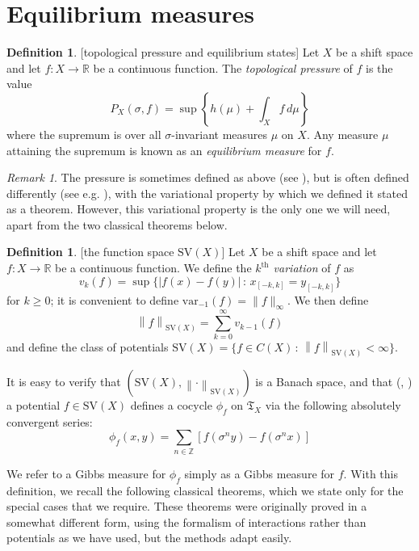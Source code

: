 \documentclass{amsproc}
\numberwithin{theorem}{section}
\theoremstyle{remark}
\newtheorem*{remark}{Remark}
\theoremstyle{definition}
\newtheorem{defn}[theorem]{Definition}
\newcommand{\fT}{\mathfrak{T}}
\newcommand{\Z}{\mathbb{Z}}
\newcommand{\R}{\mathbb{R}}
\newcommand{\SV}{\mathrm{SV}}
\newcommand\SVnorm[2]{\left\lVert#1\right\rVert_{\mathrm{SV}(#2)}}
\newcommand{\var}{\mathrm{var}}
\theoremstyle{plain}
\begin{document}
\section{Equilibrium measures}\label{eqm-section}


\begin{defn}\label{topological-pressure-and-equilibrium-states}[topological pressure and equilibrium states]
Let $X$ be a shift space and let $f\colon X \to \R $ be a continuous function. The \textit{topological pressure} of $f$ is the value
\[
P_X(\sigma, f) = \sup \left\{ h(\mu) + \int_X f \, d\mu\right\}
\]
where the supremum is over all $\sigma$-invariant measures $\mu$ on $X$. Any measure $\mu$ attaining the supremum is known as an \textit{equilibrium measure} for $f$.
\end{defn}

\begin{remark}
The pressure is sometimes defined as above (see \cite{keller1998equilibrium}), but is often defined differently (see e.g. \cite{walters1982ergodic}), with the variational property by which we defined it stated as a theorem. However, this variational property is the only one we will need, apart from the two classical theorems below.
\end{remark}

\begin{defn}\label{SV-space}[the function space $\SV(X)$]
Let $X$ be a shift space and let $f\colon X \to \R $ be a continuous function. We define the \textit{$k^{\text{th}}$ variation} of $f$ as
\[
v_k(f) = \sup \{ | f(x) - f(y) | \, : \, x_{[-k,k]} = y_{[-k,k]} \}
\]
for $k \geq 0$; it is convenient to define $\var_{-1}(f) = \| f \|_{\infty}$. We then define
\[
\SVnorm{f}{X} = \sum_{k=0}^{\infty}  v_{k-1}(f)
\]
and define the class of potentials $\SV(X) = \{ f \in C(X) \, : \,  \SVnorm{f}{X} < \infty   \}$.
\end{defn}

It is easy to verify that $\left(\SV(X), \SVnorm{\cdot}{X} \right)$ is a Banach space, and that (\cite{meyerovitch2013gibbs}, \cite{borsato2020conformal}) a potential $f \in \SV(X)$ defines a cocycle $\phi_f$ on $\fT_X$ via the following absolutely convergent series:
\[
\phi_f(x,y) = \sum_{n \in \Z} [ f(\sigma^n y) - f(\sigma^n x)  ]
\]


We refer to a Gibbs measure for $\phi_f$ simply as a Gibbs measure for $f$. With this definition, we recall the following classical theorems, which we state only for the special cases that we require. These theorems were originally proved in a somewhat different form, using the formalism of interactions rather than potentials as we have used, but the methods adapt easily.
\end{document}
